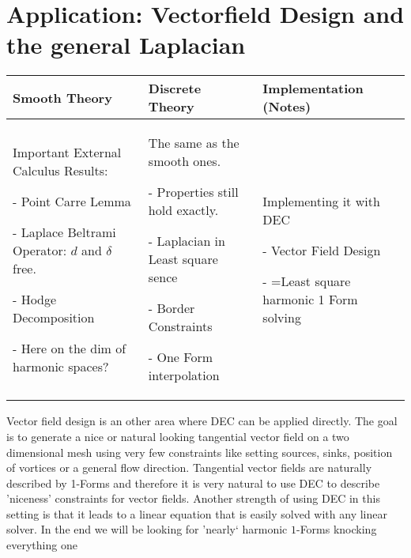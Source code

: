 \chapter{Application: Vectorfield Design and the general Laplacian}
	\begin{longtable}{|p{4.5cm}|p{4.5cm}|p{4.5cm}|}
		\hline
		Smooth Theory& Discrete Theory& Implementation (Notes)\\
		\hline
			Important External Calculus Results:
			\begin{packed_enum}
				\item[-] Point Carre Lemma
				\item[-] Laplace Beltrami Operator: $d$ and $\delta$ free.
				\item[-] Hodge Decomposition
				\item[-] Here on the dim of harmonic spaces?
			\end{packed_enum}
			&
			The same as the smooth ones.
			\begin{packed_enum}
				\item[-] Properties still hold exactly.
				\item[-] Laplacian in Least square sence
				\item[-] Border Constraints
				\item[-] One Form interpolation
			\end{packed_enum}
			 & 
			 Implementing it with DEC
			 \begin{packed_enum}
				\item[-] Vector Field Design
				\item[-] =Least square harmonic 1 Form solving
			\end{packed_enum}
			 \\		
		\hline
	\end{longtable}
	
Vector field design is an other area where DEC can be applied directly. The goal is to generate a nice or natural looking tangential vector field on a two dimensional mesh using very few constraints like setting sources, sinks, position of vortices or a general flow direction. Tangential vector fields are naturally described by 1-Forms and therefore it is very natural to use DEC to describe 'niceness' constraints for vector fields. Another strength of using DEC in this setting is that it leads to a linear equation that is easily solved with any linear solver. In the end we will be looking for 'nearly` harmonic $1$-Forms knocking everything one

